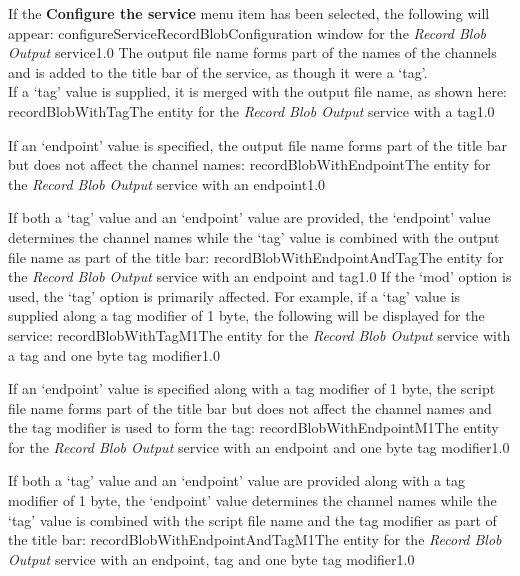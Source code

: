If the \textbf{Configure the service} menu item has been selected, the following will
appear:
%
{configureServiceRecordBlob}{Configuration window for the \emph{Record Blob Output}
service}{1.0}
\condPage{}
The output file name forms part of the names of the channels and is added to the title bar
of the service, as though it were a `tag'.\\

If a `tag' value is supplied, it is merged with the output file name, as shown here:
%
{recordBlobWithTag}{The \emph{\MMMU} entity for the \emph{Record Blob Output} service with
a tag}{1.0}

If an `endpoint' value is specified, the output file name forms part of the title bar but
does not affect the channel names:
%
{recordBlobWithEndpoint}{The \emph{\MMMU} entity for the \emph{Record Blob Output} service
with an endpoint}{1.0}

If both a `tag' value and an `endpoint' value are provided, the `endpoint' value
determines the channel names while the `tag' value is combined with the output file name
as part of the title bar:
%
{recordBlobWithEndpointAndTag}{The \emph{\MMMU} entity for the \emph{Record Blob Output}
service with an endpoint and tag}{1.0}
\condPage{}
If the `mod' option is used, the `tag' option is primarily affected.
For example, if a `tag' value is supplied along a tag modifier of 1 byte, the following
will be displayed for the service:
%
{recordBlobWithTagM1}{The \emph{\MMMU} entity for the \emph{Record Blob Output} service
with a tag and one byte tag modifier}{1.0}

If an `endpoint' value is specified along with a tag modifier of 1 byte, the script file
name forms part of the title bar but does not affect the channel names and the tag
modifier is used to form the tag:
%
{recordBlobWithEndpointM1}{The \emph{\MMMU} entity for the \emph{Record Blob Output}
service with an endpoint and one byte tag modifier}{1.0}

If both a `tag' value and an `endpoint' value are provided along with a tag modifier of 1
byte, the `endpoint' value determines the channel names while the `tag' value is combined
with the script file name and the tag modifier as part of the title bar:
%
{recordBlobWithEndpointAndTagM1}{The \emph{\MMMU} entity for the \emph{Record Blob Output}
service with an endpoint, tag and one byte tag modifier}{1.0}

